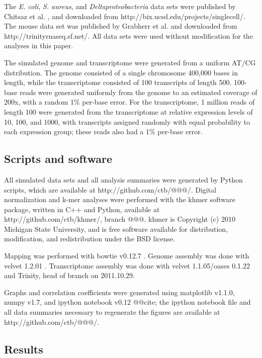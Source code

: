 \documentclass[10pt]{article}
\begin{document}
The {\em E. coli}, {\em S. aureus}, and {\em Deltaproteobacteria} data sets
were published by Chitsaz et al. \cite{pubmed21926975}, and downloaded
from http://bix.ucsd.edu/projects/singlecell/.  The mouse data set was
published by Grabherr et al. \cite{pubmed21572440} and downloaded
from http://trinityrnaseq.sf.net/.  All data sets were used without
modification for the analyses in this paper.

The simulated genome and transcriptome were generated from a uniform
AT/CG distribution.  The genome consisted of a single chromosome
400,000 bases in length, while the transcriptome consisted of 100
transcripts of length 500.  100-base reads were generated uniformly
from the genome to an estimated coverage of 200x, with a random 1\%
per-base error.  For the transcriptome, 1 million reads of length 100
were generated from the transcriptome at relative expression levels of
10, 100, and 1000, with transcripts assigned randomly with equal
probability to each expression group; these reads also had a 1\%
per-base error.

\subsection*{Scripts and software}

All simulated data sets and all analysis summaries were generated by
Python scripts, which are available at http://github.com/ctb/@@@/.
Digital normalization and k-mer analyses were performed with the khmer
software package, written in C++ and Python, available at
http://github.com/ctb/khmer/, branch @@@.  khmer is Copyright (c) 2010
Michigan State University, and is free software available for
distribution, modification, and redistribution under the BSD license.

Mapping was performed with bowtie v0.12.7 \cite{pubmed19261174}.
Genome assembly was done with velvet 1.2.01 \cite{pubmed18349386}.
Transcriptome assembly was done with velvet 1.1.05/oases 0.1.22 and
Trinity, head of branch on 2011.10.29.

Graphs and correlation coefficients were generated using matplotlib
v1.1.0, numpy v1.7, and ipython notebook v0.12 @@cite; the ipython
notebook file and all data summaries necessary to regenerate the
figures are available at http://github.com/ctb/@@@/.

\subsection*{Results}
\end{document}
